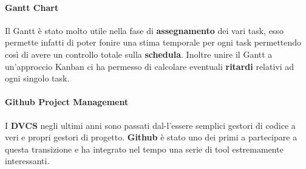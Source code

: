 \paragraph{Gantt Chart}
Il Gantt è stato molto utile nella fase di \textbf{assegnamento} dei vari task, esso permette infatti di poter fonire una stima temporale per ogni task permettendo così di avere un controllo totale sulla \textbf{schedula}. Inoltre unire il Gantt a un'approccio Kanban ci ha permesso di calcolare eventuali \textbf{ritardi} relativi ad ogni singolo task.

\paragraph{Github Project Management}
I \textbf{DVCS} negli ultimi anni sono passati dal-l'essere semplici gestori di codice a veri e propri gestori di progetto. \textbf{Github} è stato uno dei primi a partecipare a questa transizione e ha integrato nel tempo una serie di tool estremamente interessanti.

